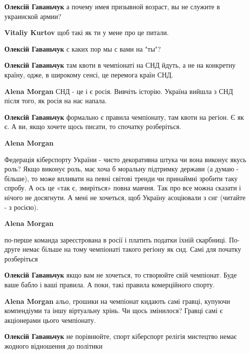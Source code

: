 \begin{itemize}
\begin{itemize}
\begin{itemize}
\textbf{Олексій Гаваньчук} а почему имея призывной возраст, вы не служите в украинской армии?

\textbf{Vitaliy Kurtov} щоб такі як ти у мене про це питали.

\textbf{Олексій Гаваньчук} с каких пор мы с вами на "ты"?
\end{itemize} %

\textbf{Олексій Гаваньчук} там квоти в чемпіонаті на СНД йдуть, а не на конкретну країну, одже, в широкому сенсі, це перемога країн СНД.

\begin{itemize} %
\textbf{Alena Morgan} СНД - це і є росія. Вивчіть історію. Україна вийшла з СНД після того, як росія на нас напала.

\textbf{Олексій Гаваньчук} формально є правила чемпіонату, там квоти на регіон. Є як є. А ви, якщо хочете щось писати, то спочатку розберіться.

\textbf{Alena Morgan} 

Федерація кіберспорту України - чисто декоративна штука чи вона виконує якусь
роль? Якщо виконує роль, має хоча б моральну підтримку держави (а думаю -
більше), то може впливати на певні світові тренди чи принаймні зробити таку
спробу. А ось це «так є, змиріться» повна маячня. Так про все можна сказати і
нічого не досягнути. А мені не хочеться, щоб Україну асоціювали з снг (читайте
- з росією).

\textbf{Alena Morgan} 

по-перше команда зареєстрована в росії і платить податки їхній скарбниці.
По-друге немає більше на тому чемпіонаті такого регіону як снд. Самі для
початку розберіться

\textbf{Олексій Гаваньчук} якщо вам не хочеться, то створюйте свій чемпіонат. Буде ваше бабло і ваші правила. А поки, такі правила комерційного спорту.

\textbf{Alena Morgan} альо, грошики на чемпіонат кидають самі гравці, купуючи компендіуми та іншу віртуальну хрінь. Чи щось змінилося? Гравці самі є акціонерами цього чемпіонату.
\end{itemize} %

\textbf{Олексій Гаваньчук} не порівнюйте, спорт кіберспорт релігія мистецтво немає жодного відношення до політики


\end{itemize}
\end{itemize}
